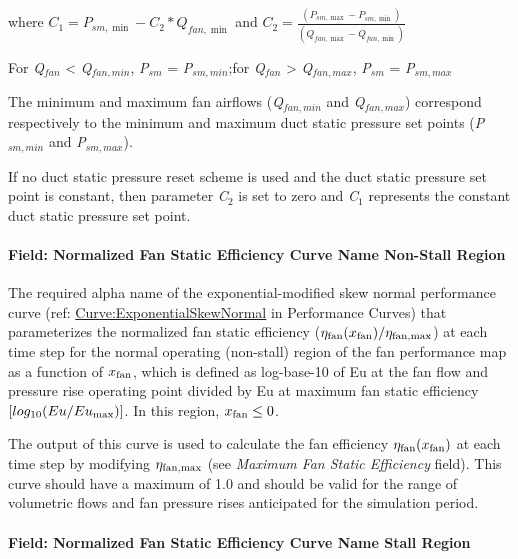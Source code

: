 where \({C_1} = {P_{sm,\min }} - {C_2}*{Q_{fan,\min }}\) and \({C_2} = \frac{{\left( {{P_{sm,\max }} - {P_{sm,\min }}} \right)}}{{\left( {{Q_{fan,\max }} - {Q_{fan,\min }}} \right)}}\)

For \emph{Q\(_{fan}\)} \textless{} \emph{Q\(_{fan,min}\)}, \emph{P\(_{sm}\)} = \emph{P\(_{sm,min}\)};for \emph{Q\(_{fan}\)} \textgreater{} \emph{Q\(_{fan,max}\)}, \emph{P\(_{sm}\)} = \emph{P\(_{sm,max}\)}

The minimum and maximum fan airflows (\emph{Q\(_{fan,min}\)} and \emph{Q\(_{fan,max}\)}) correspond respectively to the minimum and maximum duct static pressure set points (\emph{P\(_{sm,min}\)} and \emph{P\(_{sm,max}\)}).

If no duct static pressure reset scheme is used and the duct static pressure set point is constant, then parameter \emph{C\(_{2}\)} is set to zero and \emph{C\(_{1}\)} represents the constant duct static pressure set point.

\paragraph{Field: Normalized Fan Static Efficiency Curve Name Non-Stall Region}\label{field-normalized-fan-static-efficiency-curve-name-non-stall-region}

The required alpha name of the exponential-modified skew normal performance curve (ref: \hyperref[curveexponentialskewnormal]{Curve:ExponentialSkewNormal} in Performance Curves) that parameterizes the normalized fan static efficiency (\(\eta_{\rm{fan}}(x_{\rm{fan}}) / \eta_{\rm{fan, max}}\)) at each time step for the normal operating (non-stall) region of the fan performance map as a function of \(x_{\rm{fan}}\), which is defined as log-base-10 of Eu at the fan flow and pressure rise operating point divided by Eu at maximum fan static efficiency \([log_{10}(Eu / Eu_{\rm{max}})]\). In this region, \(x_{\rm{fan}} \le 0\).

The output of this curve is used to calculate the fan efficiency \(\eta_{\rm{fan}} (x_{\rm{fan}})\) at each time step by modifying \(\eta_{\rm{fan, max}}\) (see \emph{Maximum Fan Static Efficiency} field). This curve should have a maximum of 1.0 and should be valid for the range of volumetric flows and fan pressure rises anticipated for the simulation period.

\paragraph{Field: Normalized Fan Static Efficiency Curve Name Stall Region}\label{field-normalized-fan-static-efficiency-curve-name-stall-region}

